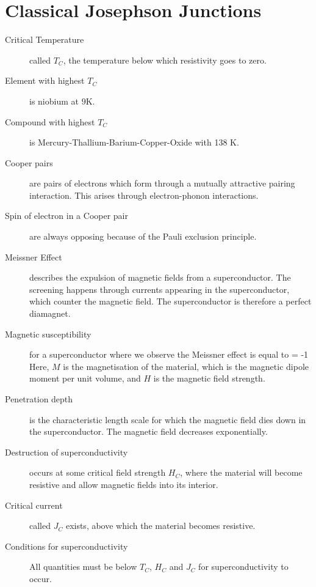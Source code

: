 \section{Classical Josephson Junctions}
\begin{description}
\item[Critical Temperature] called $T_C$, the temperature below which resistivity goes to zero. 

\item[Element with highest $T_C$] is niobium at $9$K. 

\item[Compound with highest $T_C$] is Mercury-Thallium-Barium-Copper-Oxide with 138 K. 

\item[Cooper pairs] are pairs of electrons which form through a mutually attractive pairing interaction. This arises through electron-phonon interactions. 

\item[Spin of electron in a Cooper pair] are always opposing because of the Pauli exclusion principle. 

\item[Meissner Effect] describes the expulsion of magnetic fields from a superconductor. The screening happens through currents appearing in the superconductor, which counter the magnetic field. The superconductor is therefore a perfect diamagnet. 

\item[Magnetic susceptibility] for a superconductor where we observe the Meissner effect is equal to 
\beq
{} = -1
\eeq
Here, $M$ is the magnetisation of the material, which is the magnetic dipole moment per unit volume, and $H$ is the magnetic field strength. 

\item[Penetration depth] is the characteristic length scale for which the magnetic field dies down in the superconductor. The magnetic field decreases exponentially. 

\item[Destruction of superconductivity] occurs at some critical field strength $H_C$, where the material will become resistive and allow magnetic fields into its interior. 

\item[Critical current] called $J_C$ exists, above which the material becomes resistive. 

\item[Conditions for superconductivity] All quantities must be below $T_C$, $H_C$ and $J_C$ for superconductivity to occur. 


\end{description}
